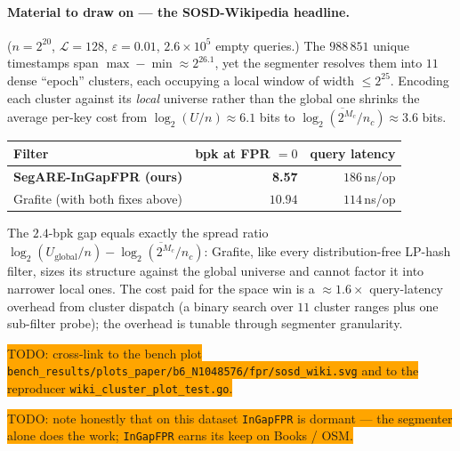 \paragraph{Material to draw on --- the SOSD-Wikipedia headline.}
($n = 2^{20}$, $\mathcal{L} = 128$, $\varepsilon = 0.01$,
$2.6 \times 10^{5}$ empty queries.) The $988\,851$ unique
timestamps span $\max - \min \approx 2^{26.1}$, yet the
segmenter resolves them into $11$ dense ``epoch'' clusters, each
occupying a local window of width $\le 2^{25}$. Encoding each
cluster against its \emph{local} universe rather than the global
one shrinks the average per-key cost from
$\log_2(U/n) \approx 6.1$ bits to
$\overline{\log_2(2^{M_c}/n_c)} \approx 3.6$ bits.

\begin{center}
\begin{tabular}{lrr}
\toprule
Filter & bpk at FPR $= 0$ & query latency \\
\midrule
\textbf{SegARE-InGapFPR (ours)} & \textbf{8.57} & $186$\,ns/op \\
Grafite (with both fixes above) & $10.94$       & $114$\,ns/op \\
\bottomrule
\end{tabular}
\end{center}

The $2.4$-bpk gap equals exactly the spread ratio
$\log_2(U_{\text{global}}/n) -
\overline{\log_2(2^{M_c}/n_c)}$: Grafite, like every
distribution-free LP-hash filter, sizes its structure against the
global universe and cannot factor it into narrower local ones.
The cost paid for the space win is a $\approx 1.6\times$
query-latency overhead from cluster dispatch (a binary search over
$11$ cluster ranges plus one sub-filter probe); the overhead is
tunable through segmenter granularity.

\colorbox{orange}{TODO: cross-link to the bench plot \texttt{bench\_results/plots\_paper/b6\_N1048576/fpr/sosd\_wiki.svg} and to the reproducer \texttt{wiki\_cluster\_plot\_test.go}.}

\colorbox{orange}{TODO: note honestly that on this dataset \texttt{InGapFPR} is dormant --- the segmenter alone does the work; \texttt{InGapFPR} earns its keep on Books / OSM.}
